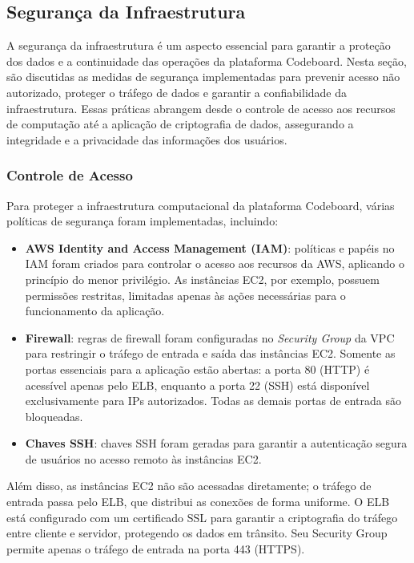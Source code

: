 \subsection{Segurança da Infraestrutura}

A segurança da infraestrutura é um aspecto essencial para garantir a proteção dos dados e a continuidade das operações da plataforma Codeboard. Nesta seção, são discutidas as medidas de segurança implementadas para prevenir acesso não autorizado, proteger o tráfego de dados e garantir a confiabilidade da infraestrutura. Essas práticas abrangem desde o controle de acesso aos recursos de computação até a aplicação de criptografia de dados, assegurando a integridade e a privacidade das informações dos usuários. 

\subsubsection{Controle de Acesso}

Para proteger a infraestrutura computacional da plataforma Codeboard, várias políticas de segurança foram implementadas, incluindo:

\begin{itemize}
    \item \textbf{AWS Identity and Access Management (IAM)}: políticas e papéis no IAM foram criados para controlar o acesso aos recursos da AWS, aplicando o princípio do menor privilégio. As instâncias EC2, por exemplo, possuem permissões restritas, limitadas apenas às ações necessárias para o funcionamento da aplicação.
    \item \textbf{Firewall}: regras de firewall foram configuradas no \emph{Security Group} da VPC para restringir o tráfego de entrada e saída das instâncias EC2. Somente as portas essenciais para a aplicação estão abertas: a porta 80 (HTTP) é acessível apenas pelo ELB, enquanto a porta 22 (SSH) está disponível exclusivamente para IPs autorizados. Todas as demais portas de entrada são bloqueadas.
    \item \textbf{Chaves SSH}: chaves SSH foram geradas para garantir a autenticação segura de usuários no acesso remoto às instâncias EC2.
\end{itemize}

Além disso, as instâncias EC2 não são acessadas diretamente; o tráfego de entrada passa pelo ELB, que distribui as conexões de forma uniforme. O ELB está configurado com um certificado SSL para garantir a criptografia do tráfego entre cliente e servidor, protegendo os dados em trânsito. Seu Security Group permite apenas o tráfego de entrada na porta 443 (HTTPS).

